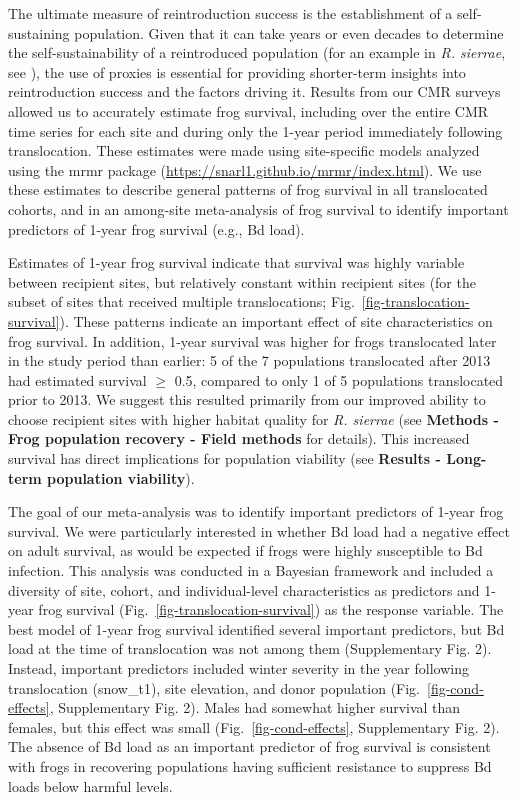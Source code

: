 \documentclass[
  letterpaper,
  DIV=11,
  numbers=noendperiod]{scrartcl}
\begin{document}
The ultimate measure of reintroduction success is the establishment of a
self-sustaining population. Given that it can take years or even decades
to determine the self-sustainability of a reintroduced population (for
an example in \emph{R. sierrae}, see \citep{joseph2018}), the use of
proxies is essential for providing shorter-term insights into
reintroduction success and the factors driving it. Results from our CMR
surveys allowed us to accurately estimate frog survival, including over
the entire CMR time series for each site and during only the 1-year
period immediately following translocation. These estimates were made
using site-specific models analyzed using the mrmr package
\citep{joseph2019} (\url{https://snarl1.github.io/mrmr/index.html}). We
use these estimates to describe general patterns of frog survival in all
translocated cohorts, and in an among-site meta-analysis of frog
survival to identify important predictors of 1-year frog survival (e.g.,
Bd load).

Estimates of 1-year frog survival indicate that survival was highly
variable between recipient sites, but relatively constant within
recipient sites (for the subset of sites that received multiple
translocations; Fig.~\ref{fig-translocation-survival}). These patterns
indicate an important effect of site characteristics on frog survival.
In addition, 1-year survival was higher for frogs translocated later in
the study period than earlier: 5 of the 7 populations translocated after
2013 had estimated survival \(\ge\) 0.5, compared to only 1 of 5
populations translocated prior to 2013. We suggest this resulted
primarily from our improved ability to choose recipient sites with
higher habitat quality for \emph{R. sierrae} (see \textbf{Methods - Frog
population recovery - Field methods} for details). This increased
survival has direct implications for population viability (see
\textbf{Results - Long-term population viability}).

The goal of our meta-analysis was to identify important predictors of
1-year frog survival. We were particularly interested in whether Bd load
had a negative effect on adult survival, as would be expected if frogs
were highly susceptible to Bd infection. This analysis was conducted in
a Bayesian framework and included a diversity of site, cohort, and
individual-level characteristics as predictors and 1-year frog survival
(Fig.~\ref{fig-translocation-survival}) as the response variable. The
best model of 1-year frog survival identified several important
predictors, but Bd load at the time of translocation was not among them
(Supplementary Fig. 2). Instead, important predictors included winter
severity in the year following translocation (snow\_t1), site elevation,
and donor population (Fig.~\ref{fig-cond-effects}, Supplementary Fig.
2). Males had somewhat higher survival than females, but this effect was
small (Fig.~\ref{fig-cond-effects}, Supplementary Fig. 2). The absence
of Bd load as an important predictor of frog survival is consistent with
frogs in recovering populations having sufficient resistance to suppress
Bd loads below harmful levels.
\end{document}
